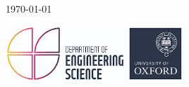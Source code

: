 \documentclass[11pt]{article}
\begin{document}
\begin{titlepage}
	
	\vfill\vfill\vfill %
	
	{\large\today} %
	
	
	\vfill\vfill
	\includegraphics[width=0.5\textwidth]{Figures/logo.png}\\[1cm] %
	 
	
	\vfill %
	
\end{titlepage}
\end{document}
